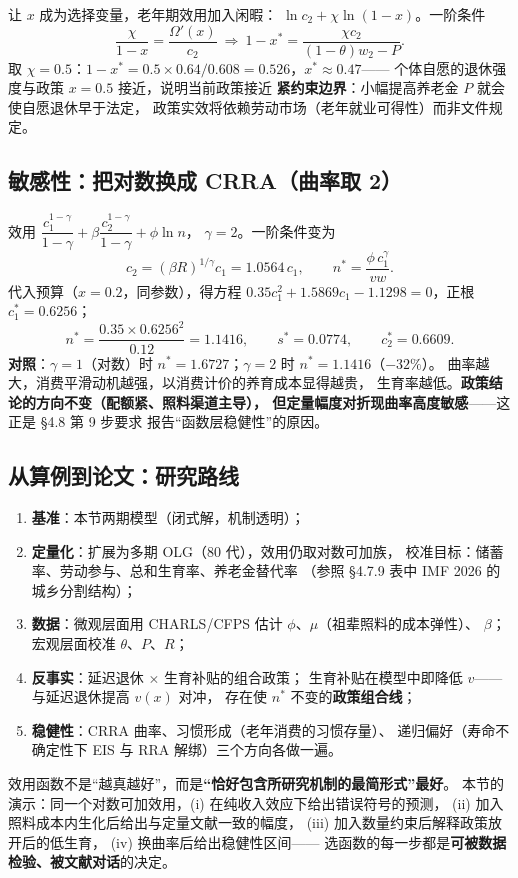 让 $x$ 成为选择变量，老年期效用加入闲暇：
$\ln c_2+\chi\ln(1-x)$。一阶条件
\[
\frac{\chi}{1-x}=\frac{\Omega'(x)}{c_2}
\ \Longrightarrow\
1-x^*=\frac{\chi c_2}{(1-\theta)w_2-P}.
\]
取 $\chi=0.5$：$1-x^*=0.5\times0.64/0.608=0.526$，$x^*\approx0.47$——
个体自愿的退休强度与政策 $x=0.5$ 接近，说明当前政策接近
\textbf{紧约束边界}：小幅提高养老金 $P$ 就会使自愿退休早于法定，
政策实效将依赖劳动市场（老年就业可得性）而非文件规定。

\subsection{敏感性：把对数换成 CRRA（曲率取 2）}\label{subsec:crra-check}

效用 $\dfrac{c_1^{1-\gamma}}{1-\gamma}+\beta\dfrac{c_2^{1-\gamma}}{1-\gamma}+\phi\ln n$，
$\gamma=2$。一阶条件变为
\[
c_2=(\beta R)^{1/\gamma}c_1=1.0564\,c_1,\qquad
n^*=\frac{\phi\,c_1^{\gamma}}{vw}.
\]
代入预算（$x=0.2$，同参数），得方程
$0.35c_1^2+1.5869c_1-1.1298=0$，正根 $c_1^*=0.6256$；
\[
n^*=\frac{0.35\times0.6256^2}{0.12}=1.1416,\qquad
s^*=0.0774,\qquad c_2^*=0.6609.
\]
\textbf{对照}：$\gamma=1$（对数）时 $n^*=1.6727$；$\gamma=2$ 时 $n^*=1.1416$（$-32\%$）。
曲率越大，消费平滑动机越强，以消费计价的养育成本显得越贵，
生育率越低。\textbf{政策结论的方向不变（配额紧、照料渠道主导），
但定量幅度对折现曲率高度敏感}——这正是 §4.8 第 9 步要求
报告“函数层稳健性”的原因。

\subsection{从算例到论文：研究路线}

\begin{enumerate}
  \item \textbf{基准}：本节两期模型（闭式解，机制透明）；
  \item \textbf{定量化}：扩展为多期 OLG（80 代），效用仍取对数可加族，
        校准目标：储蓄率、劳动参与、总和生育率、养老金替代率
        （参照 §4.7.9 表中 IMF 2026 的城乡分割结构）；
  \item \textbf{数据}：微观层面用 CHARLS/CFPS 估计 $\phi$、$\mu$（祖辈照料的成本弹性）、
        $\beta$；宏观层面校准 $\theta$、$P$、$R$；
  \item \textbf{反事实}：延迟退休 $\times$ 生育补贴的组合政策；
        生育补贴在模型中即降低 $v$——与延迟退休提高 $v(x)$ 对冲，
        存在使 $n^*$ 不变的\textbf{政策组合线}；
  \item \textbf{稳健性}：CRRA 曲率、习惯形成（老年消费的习惯存量）、
        递归偏好（寿命不确定性下 EIS 与 RRA 解绑）三个方向各做一遍。
\end{enumerate}

效用函数不是“越真越好”，而是\textbf{“恰好包含所研究机制的最简形式”最好}。
本节的演示：同一个对数可加效用，(i) 在纯收入效应下给出错误符号的预测，
(ii) 加入照料成本内生化后给出与定量文献一致的幅度，
(iii) 加入数量约束后解释政策放开后的低生育，
(iv) 换曲率后给出稳健性区间——
选函数的每一步都是\textbf{可被数据检验、被文献对话}的决定。
